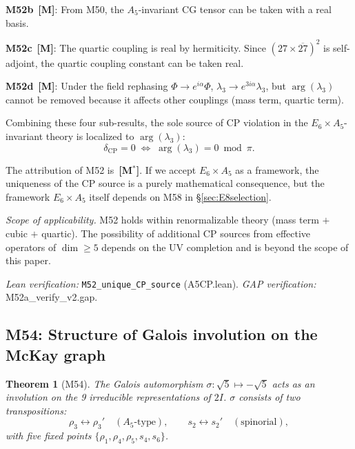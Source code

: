 \documentclass[sn-mathphys-num,Numbered]{sn-jnl}
\theoremstyle{thmstyleone}
\newtheorem{theorem}{Theorem}[section]
\theoremstyle{thmstylethree}
\newcommand{\layerM}{\textbf{[M]}}
\newcommand{\layerMs}{\textbf{[M$^*$]}}
\begin{document}
\textbf{M52b}~\layerM: From M50, the $A_5$-invariant CG tensor can be taken
with a real basis.

\textbf{M52c}~\layerM: The quartic coupling is real by hermiticity.  Since
$(27 \times \overline{27})^2$ is self-adjoint, the quartic coupling constant
can be taken real.

\textbf{M52d}~\layerM: Under the field rephasing $\Phi \to e^{i\alpha}\Phi$,
$\lambda_3 \to e^{3i\alpha}\lambda_3$, but $\arg(\lambda_3)$ cannot be
removed because it affects other couplings (mass term, quartic term).

Combining these four sub-results, the sole source of CP violation in the
$E_6 \times A_5$-invariant theory is localized to $\arg(\lambda_3)$:
\begin{equation}\label{eq:CPcondition}
  \delta_{\mathrm{CP}} = 0
  \;\Longleftrightarrow\;
  \arg(\lambda_3) = 0 \bmod \pi.
\end{equation}

The attribution of M52 is~\layerMs.  If we accept $E_6 \times A_5$ as a
framework, the uniqueness of the CP source is a purely mathematical
consequence, but the framework $E_6 \times A_5$ itself depends on M58 in
\S\ref{sec:E8selection}.

\emph{Scope of applicability.}
M52 holds within renormalizable theory (mass term $+$ cubic $+$ quartic).
The possibility of additional CP sources from effective operators of
$\dim \geq 5$ depends on the UV completion and is beyond the scope of this
paper.

\noindent\textit{Lean verification:} \texttt{M52\_unique\_CP\_source}
(A5CP.lean).  \textit{GAP verification:} M52a\_verify\_v2.gap.


\subsection{M54: Structure of Galois involution on the McKay graph}\label{sec:M54}

\begin{theorem}[M54]\label{thm:M54}
The Galois automorphism $\sigma\colon \sqrt{5} \mapsto -\sqrt{5}$ acts as an
involution on the 9 irreducible representations of $2I$.  $\sigma$ consists
of two transpositions:
\begin{equation}\label{eq:sigma-transpositions}
  \rho_3 \leftrightarrow \rho_3'
  \quad (A_5\text{-type}),
  \qquad
  s_2 \leftrightarrow s_2'
  \quad (\text{spinorial}),
\end{equation}
with five fixed points $\{\rho_1, \rho_4, \rho_5, s_4, s_6\}$.
\end{theorem}
\end{document}
